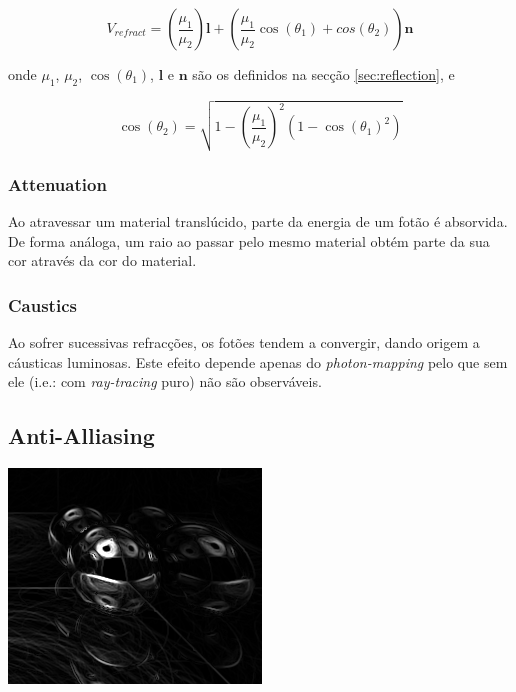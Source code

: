 \documentclass[a4paper]{article}
\begin{document}
\begin{displaymath}
	V_{refract} = \left(\frac{\mu_{1}}{\mu_{2}}\right)\mathbf{l} + \left(\frac{\mu_{1}}{\mu_{2}} \cos(\theta_{1}) + cos(\theta_{2})\right)\mathbf{n}
\end{displaymath}

onde $\mu_{1}$, $\mu_{2}$, $\cos(\theta_{1})$, $\mathbf{l}$ e $\mathbf{n}$ são os definidos na secção \ref{sec:reflection}, e

\begin{displaymath}
	\cos(\theta_{2}) = \sqrt{1 - \left(\frac{\mu_{1}}{\mu_{2}}\right)^2 \left(1 - \cos\left(\theta_{1}\right)^2\right)}
\end{displaymath}

\subsubsection{Attenuation}
\indent \indent Ao atravessar um material translúcido, parte da energia de um fotão é absorvida. De forma análoga,
um raio ao passar pelo mesmo material obtém parte da sua cor através da cor do material.

\subsubsection{Caustics}
\indent \indent Ao sofrer sucessivas refracções, os fotões tendem a convergir, dando origem a cáusticas luminosas.
Este efeito depende apenas do \emph{photon-mapping} pelo que sem ele (i.e.: com \emph{ray-tracing} puro)
não são observáveis.

\cleardoublepage
\subsection{Anti-Alliasing}
\begin{center}
	\includegraphics[scale=0.50]{images/sobel.png}
	\label{fig:sobel}
\end{center}
\end{document}
